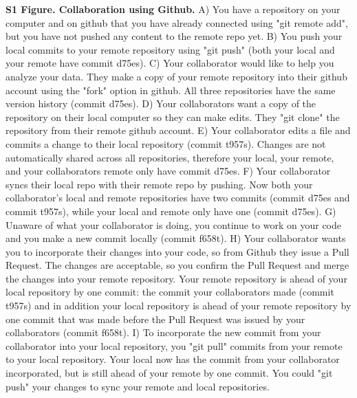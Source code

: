 \textbf{S1 Figure. Collaboration using Github.}
A) You have a repository on your computer and on github that you have already connected using "git remote add", but you have not pushed any content to the remote repo yet.
B) You push your local commits to your remote repository using "git push" (both your local and your remote have commit d75es).
C) Your collaborator would like to help you analyze your data.
They make a copy of your remote repository into their github account using the "fork" option in github.
All three repositories have the same version history (commit d75es).
D) Your collaborators want a copy of the repository on their local computer so they can make edits.
They "git clone" the repository from their remote github account.
E) Your collaborator edits a file and commits a change to their local repository (commit t957s).
Changes are not automatically shared across all repositories, therefore your local, your remote, and your collaborators remote only have commit d75es.
F) Your collaborator syncs their local repo with their remote repo by pushing.
Now both your collaborator's local and remote repositories have two commits (commit d75es and commit t957s), while your local and remote only have one (commit d75es).
G) Unaware of what your collaborator is doing, you continue to work on your code and you make a new commit locally (commit f658t).
H) Your collaborator wants you to incorporate their changes into your code, so from Github they issue a Pull Request.
The changes are acceptable, so you confirm the Pull Request and merge the changes into your remote repository.
Your remote repository is ahead of your local repository by one commit: the commit your collaborators made (commit t957s) and in addition your local repository is ahead of your remote repository by one commit that was made before the Pull Request was issued by your collaborators (commit f658t).
I) To incorporate the new commit from your collaborator into your local repository, you "git pull" commits from your remote to your local repository.
Your local now has the commit from your collaborator incorporated, but is still ahead of your remote by one commit.
You could "git push" your changes to sync your remote and local repositories.
